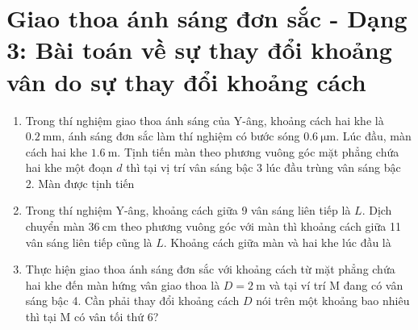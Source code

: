 \section{Giao thoa ánh sáng đơn sắc - Dạng 3: Bài toán về sự thay đổi khoảng vân do sự thay đổi khoảng cách}
\begin{enumerate}
	\item
	{
		Trong thí nghiệm giao thoa ánh sáng của Y-âng, khoảng cách hai khe là $\SI{0.2}{\milli \meter}$, ánh sáng đơn sắc làm thí nghiệm có bước sóng $\SI{0.6}{\micro \meter}$. Lúc đầu, màn cách hai khe $\SI{1.6}{\meter}$. Tịnh tiến màn theo phương vuông góc mặt phẳng chứa hai khe một đoạn $d$ thì tại vị trí vân sáng bậc 3 lúc đầu trùng vân sáng bậc 2. Màn được tịnh tiến
	}
	\item
	{
		Trong thí nghiệm Y-âng, khoảng cách giữa 9 vân sáng liên tiếp là $L$. Dịch chuyển màn $\SI{36}{\centi \meter}$ theo phương vuông góc với màn thì khoảng cách giữa 11 vân sáng liên tiếp cũng là $L$. Khoảng cách giữa màn và hai khe lúc đầu là
	}
	\item
	{
		Thực hiện giao thoa ánh sáng đơn sắc với khoảng cách từ mặt phẳng chứa hai khe đến màn hứng vân giao thoa là $D=\SI{2}{\meter}$ và tại ví trí M đang có vân sáng bậc 4. Cần phải thay đổi khoảng cách $D$ nói trên một khoảng bao nhiêu thì tại M có vân tối thứ 6?
}
\end{enumerate}
